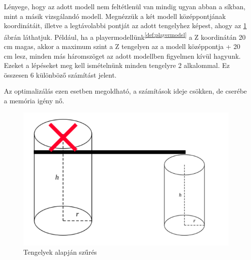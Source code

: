\newpage
{}
Lényege, hogy az adott modell nem feltétlenül van mindig ugyan abban a síkban, mint a másik vizsgálandó modell. Megnézzük a két modell középpontjának koordinátáit, illetve a legtávolabbi pontját az adott tengelyhez képest, ahogy az \ref{fig:opt_3} ábrán láthatjuk. Például, ha a playermodellünk\textsuperscript{\ref{def:playermodel}} a Z koordinátán 20 cm magas, akkor a maximum szint a Z tengelyen az a modell középpontja + 20 cm lesz, minden más háromszöget az adott modellben figyelmen kívül hagyunk. Ezeket a lépéseket meg kell ismételnünk minden tengelyre 2 alkalommal. Ez összesen 6 különböző számítást jelent.

Az optimalizálás ezen esetben megoldható, a számítások ideje csökken, de cserébe a memória igény nő.
\begin{figure}[h]
	\centering
	\includegraphics[width=13truecm, height=7.5truecm]{images/opt_5.3.png}
	\caption{Tengelyek alapján szűrés}
	\label{fig:opt_3}
\end{figure}